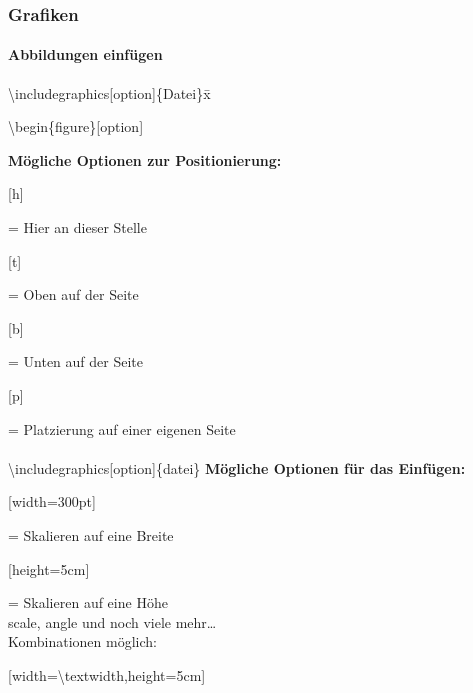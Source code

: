 \begin{frame}
\frametitle{Grafiken}
\framesubtitle{Abbildungen einfügen}
\begin{tabbing}
\textbackslash includegraphics[option]\{Datei\}x\=\kill
\hspace{-5mm}
\begin{ttfamily}
\color{unibablueI}\textbackslash begin\color{black}\{figure\}\color{nounibagreenI}[option]\color{black}
\end{ttfamily}
\>\textbf{Mögliche Optionen zur Positionierung:}\\
\>\begin{ttfamily}\color{nounibagreenI}[h]\color{black}\end{ttfamily} = Hier an dieser Stelle\\
\>\begin{ttfamily}\color{nounibagreenI}[t]\color{black}\end{ttfamily} = Oben auf der Seite\\
\>\begin{ttfamily}\color{nounibagreenI}[b]\color{black}\end{ttfamily} = Unten auf der Seite\\
\>\begin{ttfamily}\color{nounibagreenI}[p]\color{black}\end{ttfamily} = Platzierung auf einer eigenen
Seite\\[5mm]
~\\[5mm]
\hspace{-5mm}
\color{nounibaredI}\textbackslash includegraphics\color{nounibagreenI}[option]\color{black}\{datei\}
\>\textbf{Mögliche Optionen für das Einfügen:}\\
\>\begin{ttfamily}\color{nounibagreenI}[width=300pt]\color{black}\end{ttfamily}= Skalieren auf eine Breite\\
\>\begin{ttfamily}\color{nounibagreenI}[height=5cm]\color{black}\end{ttfamily}= Skalieren auf eine Höhe\\
\>scale, angle und noch viele mehr\ldots\\
\>Kombinationen möglich:\\
\>\begin{ttfamily}\color{nounibagreenI}[width=\textbackslash textwidth,height=5cm]\color{black}\end{ttfamily}
\end{tabbing}
\end{frame}

